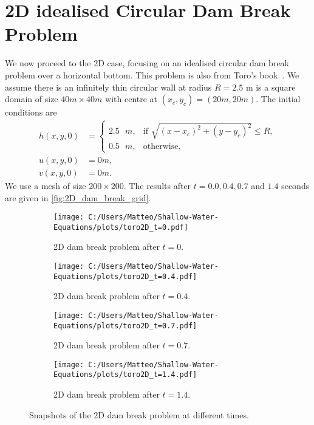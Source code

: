 \section{2D idealised Circular Dam Break Problem}
We now proceed to the 2D case, focusing on an idealised circular dam break problem over a horizontal bottom.
This problem is also from Toro's book~\cite{Toro2024}.
We assume there is an infinitely thin circular wall at radius $R = 2.5$ m is a square domain of size $40 m \times 40 m$ with centre at $(x_c,y_c) = (20 m, 20 m)$.
The initial conditions are
\begin{align*}
    h(x,y,0) &= \begin{cases}
        2.5 \text{ }m, & \text{if } \sqrt{ {(x-x_c)}^2 + {(y-y_c)}^2 } \leq R, \\
        0.5 \text{ }m, & \text{otherwise},
    \end{cases} \\
    u(x,y,0) &= 0 m, \\
    v(x,y,0) &= 0 m.
\end{align*}
We use a mesh of size $200 \times 200$.
The results after $t=0.0, 0.4, 0.7$ and $1.4$ seconds are given in \autoref{fig:2D_dam_break_grid}.
\begin{figure}[H]
    \centering
    \begin{subfigure}{0.49\textwidth}
        \centering
        \texttt{[image: C:/Users/Matteo/Shallow-Water-Equations/plots/toro2D\_t=0.pdf]}
        \caption{2D dam break problem after $t=0$.}\label{fig:2D_dam_break_t0}
    \end{subfigure}
    \hfill
    \begin{subfigure}{0.49\textwidth}
        \centering
        \texttt{[image: C:/Users/Matteo/Shallow-Water-Equations/plots/toro2D\_t=0.4.pdf]}
        \caption{2D dam break problem after $t=0.4$.}\label{fig:2D_dam_break_t0.4}
    \end{subfigure}

    \vspace{0.5cm} %

    \begin{subfigure}{0.49\textwidth}
        \centering
        \texttt{[image: C:/Users/Matteo/Shallow-Water-Equations/plots/toro2D\_t=0.7.pdf]}
        \caption{2D dam break problem after $t=0.7$.}\label{fig:2D_dam_break_t0.7}
    \end{subfigure}
    \hfill
    \begin{subfigure}{0.49\textwidth}
        \centering
        \texttt{[image: C:/Users/Matteo/Shallow-Water-Equations/plots/toro2D\_t=1.4.pdf]}
        \caption{2D dam break problem after $t=1.4$.}\label{fig:2D_dam_break_t1.4}
    \end{subfigure}

    \caption{Snapshots of the 2D dam break problem at different times.}\label{fig:2D_dam_break_grid}
\end{figure}

